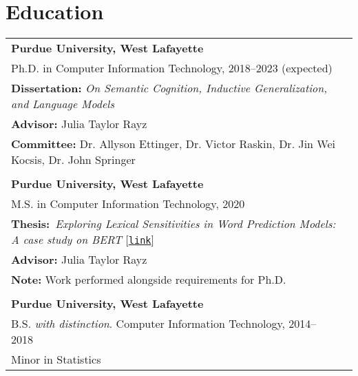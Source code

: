 \documentclass[11pt]{article}
\begin{document}
\section*{Education}
\begin{tabularx}{\textwidth}{@{}p{\textwidth}l}
\textbf{Purdue University, West Lafayette}\\
Ph.D. in Computer Information Technology, 2018--2023 (expected)\\
\textbf{Dissertation:} \textit{On Semantic Cognition, Inductive Generalization, and Language Models}\\
\textbf{Advisor:} Julia Taylor Rayz\\
\textbf{Committee:} Dr. Allyson Ettinger, Dr. Victor Raskin, Dr. Jin Wei Kocsis, Dr. John Springer\\\\
\textbf{Purdue University, West Lafayette}\\
M.S. in Computer Information Technology, 2020\\
\textbf{Thesis:}~\textit{Exploring Lexical Sensitivities in Word Prediction Models: A case study on BERT} [\href{https://hammer.figshare.com/articles/thesis/Exploring_Lexical_Sensitivities_in_Word_Prediction_Models_A_case_study_on_BERT/13308830}{\texttt{link}}]\\
\textbf{Advisor:} Julia Taylor Rayz\\
\textbf{Note:} Work performed alongside requirements for Ph.D.\\\\

\textbf{Purdue University, West Lafayette}\\
B.S. \textit{with distinction}. Computer Information Technology, 2014--2018\\
Minor in Statistics
\end{tabularx}
\end{document}
